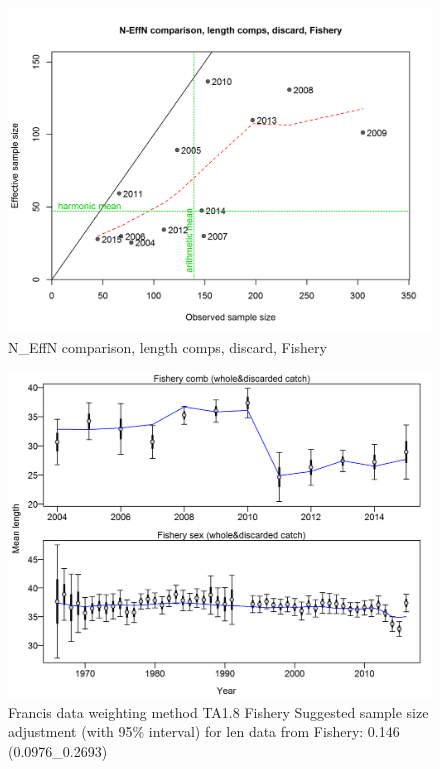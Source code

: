 \documentclass[12pt,]{article}
\begin{document}
\begin{figure}
\centering
\includegraphics{./r4ss/plots_mod1/comp_lenfit_sampsize_flt1mkt1.png}
\caption{N\_EffN comparison, length comps, discard, Fishery
\label{fig:mod1_3_comp_lenfit_sampsize_flt1mkt1}}
\end{figure}

\begin{figure}
\centering
\includegraphics{./r4ss/plots_mod1/comp_lenfit_data_weighting_TA1.8_Fishery.png}
\caption{Francis data weighting method TA1.8 Fishery Suggested sample
size adjustment (with 95\% interval) for len data from Fishery: 0.146
(0.0976\_0.2693)
\label{fig:mod1_4_comp_lenfit_data_weighting_TA1.8_Fishery}}
\end{figure}
\end{document}
